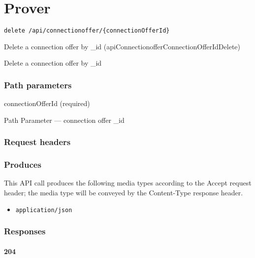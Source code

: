 \hypertarget{prover-1}{%
\section{\texorpdfstring{\protect\hypertarget{Prover}{}{Prover}}{Prover}}\label{prover-1}}

\protect\hypertarget{apiConnectionofferConnectionOfferIdDelete}{}{}

\begin{verbatim}
delete /api/connectionoffer/{connectionOfferId}
\end{verbatim}

Delete a connection offer by \_id
({apiConnectionofferConnectionOfferIdDelete})

Delete a connection offer by \_id

\hypertarget{path-parameters-57}{%
\subsubsection{Path parameters}\label{path-parameters-57}}

connectionOfferId (required)

{Path Parameter} --- connection offer \_id

\hypertarget{request-headers-60}{%
\subsubsection{Request headers}\label{request-headers-60}}

\hypertarget{produces-107}{%
\subsubsection{Produces}\label{produces-107}}

This API call produces the following media types according to the
{Accept} request header; the media type will be conveyed by the
{Content-Type} response header.

\begin{itemize}
\tightlist
\item
  \texttt{application/json}
\end{itemize}

\hypertarget{responses-110}{%
\subsubsection{Responses}\label{responses-110}}

\hypertarget{section-360}{%
\paragraph{204}\label{section-360}}

